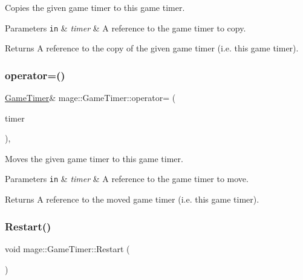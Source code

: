 Copies the given game timer to this game timer.


\begin{DoxyParams}[1]{Parameters}
\mbox{\tt in}  & {\em timer} & A reference to the game timer to copy. \\
\hline
\end{DoxyParams}
\begin{DoxyReturn}{Returns}
A reference to the copy of the given game timer (i.\+e. this game timer). 
\end{DoxyReturn}
\mbox{\label{classmage_1_1_game_timer_ae5489a5363fbf69592270a9f35f269c9}} 
\subsubsection{\texorpdfstring{operator=()}{operator=()}\hspace{0.1cm}{\footnotesize\ttfamily [2/2]}}
{\footnotesize\ttfamily \mbox{\hyperlink{classmage_1_1_game_timer}{Game\+Timer}}\& mage\+::\+Game\+Timer\+::operator= (\begin{DoxyParamCaption}\item[{\mbox{\hyperlink{classmage_1_1_game_timer}{Game\+Timer}} \&\&}]{timer }\end{DoxyParamCaption})\hspace{0.3cm}{\ttfamily [default]}, {\ttfamily [noexcept]}}

Moves the given game timer to this game timer.


\begin{DoxyParams}[1]{Parameters}
\mbox{\tt in}  & {\em timer} & A reference to the game timer to move. \\
\hline
\end{DoxyParams}
\begin{DoxyReturn}{Returns}
A reference to the moved game timer (i.\+e. this game timer). 
\end{DoxyReturn}
\mbox{\label{classmage_1_1_game_timer_a93108b016f2034da39e576067443d265}} 
\subsubsection{\texorpdfstring{Restart()}{Restart()}}
{\footnotesize\ttfamily void mage\+::\+Game\+Timer\+::\+Restart (\begin{DoxyParamCaption}{ }\end{DoxyParamCaption})\hspace{0.3cm}{\ttfamily [noexcept]}}

